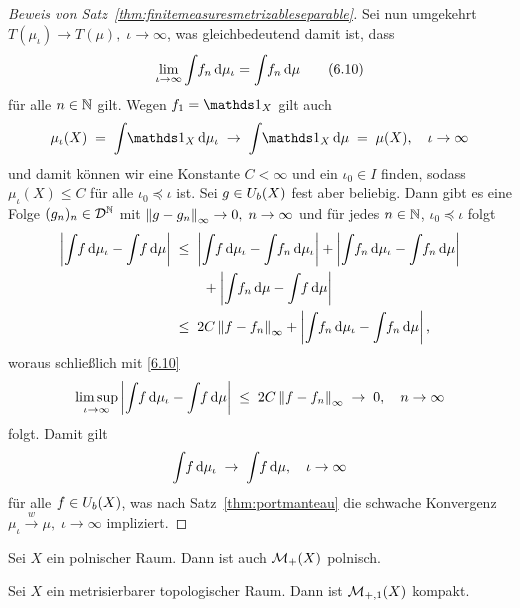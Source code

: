 \documentclass[../main/main.tex]{subfiles}
\begin{document}
\begin{proof}[Beweis von Satz~\ref{thm:finitemeasuresmetrizableseparable}]
		Sei nun umgekehrt $T(\mu_\iota) \to T(\mu), \; \iota \to \infty$, was gleichbedeutend damit ist, dass 
		\[ \lim_{\iota \to \infty} \int_{} \, f_n \, \mathrm{d}\mu_\iota = \int_{} \, f_n \, \mathrm{d}\mu \label{6.10} \tag{6.10} \] 
		für alle $n \in \mathbb{N}$ gilt.
		Wegen $f_1 = \indfct_X$ gilt auch
		\[ \mu_\iota(X) \; = \; \measureint{}{\indfct_X}{\mu_\iota} \; \to \; \measureint{}{\indfct_X}{\mu} \; = \; \mu(X), \quad \iota \to \infty \]
		und damit können wir eine Konstante $C < \infty$ und ein $\iota_0 \in I$ finden, sodass $\mu_\iota(X) \leq C$ für alle $\iota_0 \preceq \iota$ ist.
		Sei $g \in U_b(X)$ fest aber beliebig. Dann gibt es eine Folge $(g_n)_n \in \mathcal{D}^{\mathbb{N}}$ mit $\left\lVert g - g_n\right\rVert_\infty \to 0, \; n \to \infty$ und für jedes $n \in \mathbb{N}$, $\iota_0 \preceq \iota$ folgt
		\begin{align*}
			\left| \int_{} \, f \, \mathrm{d}\mu_\iota - \int_{} \, f \, \mathrm{d}\mu \right| \; &\leq \; 
			\left| \int_{} \, f \, \mathrm{d}\mu_\iota - \int_{} \, f_n \, \mathrm{d}\mu_\iota \right| + 
			\left| \int_{} \, f_n \, \mathrm{d}\mu_\iota - \int_{} \, f_n \, \mathrm{d}\mu \right| \\
			& \qquad + 
			\left| \int_{} \, f_n \, \mathrm{d}\mu - \int_{} \, f \, \mathrm{d}\mu \right| \\
			&\leq \; 2 C \left\lVert f - f_n\right\rVert_\infty + \left| \int_{} \, f_n \, \mathrm{d}\mu_\iota - 
			\int_{} \, f_n \, \mathrm{d}\mu \right| \text{,}
		\end{align*}
		woraus schließlich mit \eqref{6.10}
		\[ \limsup_{\iota \to \infty} \left| \int_{} \, f \, \mathrm{d}\mu_\iota - \int_{} \, f \, \mathrm{d}\mu \right| \; \leq \; 2 C \left\lVert f - f_n\right\rVert_\infty \; \to \; 0, \quad n \to \infty \]
		folgt. Damit gilt 
		\[ \int_{} \, f \, \mathrm{d}\mu_\iota \; \to \; \int_{} \, f \, \mathrm{d}\mu, \quad \iota \to \infty \]
		für alle $f \in U_b(X)$, was nach Satz~\ref{thm:portmanteau} die schwache Konvergenz $\mu_\iota \xrightarrow{w} \mu, \; \iota \to \infty$ impliziert.
	\end{proof}

	\begin{Satz}
		Sei $X$ ein polnischer Raum. Dann ist auch $\mathcal{M}_{+}(X)$ polnisch.
	\end{Satz}

	 \begin{Satz}
	 	Sei $X$ ein metrisierbarer topologischer Raum. Dann ist $\mathcal{M}_{+,1}(X)$ kompakt.
	 \end{Satz}
	
\end{document}
